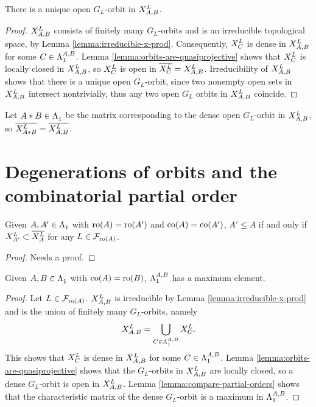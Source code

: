 \documentclass[a4paper, 11pt]{report}
\begin{document}
\begin{proposition}\label{prop:open-orbit-x-prod}
There is a unique open $G_L$-orbit in $\xprod[L]{A,B}$.
\end{proposition}

\begin{proof}
$\xprod[L]{A,B}$ consists of finitely many $G_L$-orbits and is an irreducible topological space, by Lemma \ref{lemma:irreducible-x-prod}. Consequently, $\xprod[L]{C}$ is dense in $\xprod[L]{A,B}$ for some $C\in\matrices[A,B]$. Lemma \ref{lemma:orbits-are-quasiprojective} shows that $\xprod[L]{C}$ is locally closed in $\xprod[L]{A,B}$, so $\xprod[L]{C}$ is open in $\overline{\xprod[L]{C}}=\xprod[L]{A,B}$. Irreducibility of $\xprod[L]{A,B}$ shows that there is a unique open $G_L$-orbit, since two nonempty open sets in $\xprod[L]{A,B}$ intersect nontrivially, thus any two open $G_L$ orbits in $\xprod[L]{A,B}$ coincide.
\end{proof}

Let $A\ast B\in\matrices$ be the matrix corresponding to the dense open $G_L$-orbit in $\xprod[L]{A,B}$, so $\overline{\xprod[L]{A\ast B}}=\overline{\xprod[L]{A,B}}$.

\section{Degenerations of orbits and the combinatorial partial order}

\begin{lemma}\label{lemma:compare-partial-orders}
Given $A,A'\in\matrices$ with $\ro{A}=\ro{A'}$ and $\co{A}=\co{A'}$, $A'\le A$ if and only if $\xprod[L]{A'}\subset\overline{\xprod[L]{A}}$ for any $L\in\flags_{\ro{A}}$.
\end{lemma}

{\color{blue}
\begin{proof}
Needs a proof.
\end{proof}
}

\begin{proposition}\label{proposition:existence}
Given $A,B\in\matrices$ with $\co{A}=\ro{B}$, $\matrices[A,B]$ has a maximum element.
\end{proposition}

\begin{proof}
Let $L\in\flags_{\ro{A}}$. $\xprod[L]{A,B}$ is irreducible by Lemma \ref{lemma:irreducible-x-prod} and is the union of finitely many $G_L$-orbits, namely
\begin{equation*}
\xprod[L]{A,B} = \bigcup_{C\in\matrices[A,B]} \xprod[L]{C}.
\end{equation*}
This shows that $\xprod[L]{C}$ is dense in $\xprod[L]{A,B}$ for some $C\in\matrices[A,B]$. Lemma \ref{lemma:orbits-are-quasiprojective} shows that the $G_L$-orbits in $\xprod[L]{A,B}$ are locally closed, so a dense $G_L$-orbit is open in $\xprod[L]{A,B}$. Lemma \ref{lemma:compare-partial-orders} shows that the characteristic matrix of the dense $G_L$-orbit is a maximum in $\matrices[A,B]$.
\end{proof}
\end{document}
